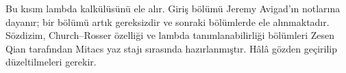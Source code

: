 \documentclass[../../include/open-logic-part]{subfiles}
\begin{document}

\begin{editorial}
Bu kısım lambda kalkülüsünü ele alır. Giriş bölümü Jeremy Avigad'ın
notlarına dayanır; bir bölümü artık gereksizdir ve sonraki bölümlerde ele
alınmaktadır. Sözdizim, Church--Rosser özelliği ve lambda tanımlanabilirliği
bölümleri Zesen Qian tarafından Mitacs yaz stajı sırasında hazırlanmıştır.
Hâlâ gözden geçirilip düzeltilmeleri gerekir.
\end{editorial}





\OLEndPartHook
\end{document}

